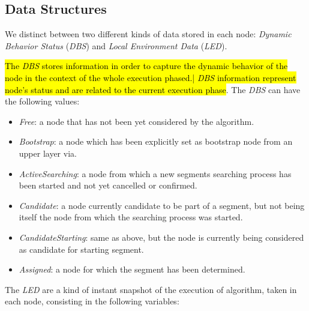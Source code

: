 \subsection{\disr{} Data Structures}
\label{ssec:disr_data}

We distinct between two different kinds of data stored in each node:
\emph{Dynamic Behavior Status} (\emph{DBS}) and \emph{Local
Environment Data} (\emph{LED}).

\hl{The \emph{DBS} stores information in order to capture the dynamic
behavior of the node in the context of the whole
\disr{} execution phased.| \emph{DBS} information represent node's status and are related to the current execution phase}. 
The \emph{DBS} can have the following values:

\begin{itemize}
\item{\emph{Free}}: a node that has  not been yet considered  by the \disr{} algorithm.
\item{\emph{Bootstrap}}: a node which has been explicitly set as bootstrap node from
an upper layer via. 
\item{\emph{ActiveSearching}}: a node from which a new segments searching process has
been started and not yet cancelled or confirmed. 
\item{\emph{Candidate}}: a node currently candidate to be part of a segment, but not being itself the node from which the searching process was started. 
\item{\emph{CandidateStarting}}: same as above, but the node is currently being considered as candidate
for starting segment. 
\item{\emph{Assigned}}: a node for which the segment has been determined.  
\end{itemize}

The \emph{LED} are a kind of instant snapshot of the execution of \disr{} algorithm, taken in each node,
consisting in the following variables:

